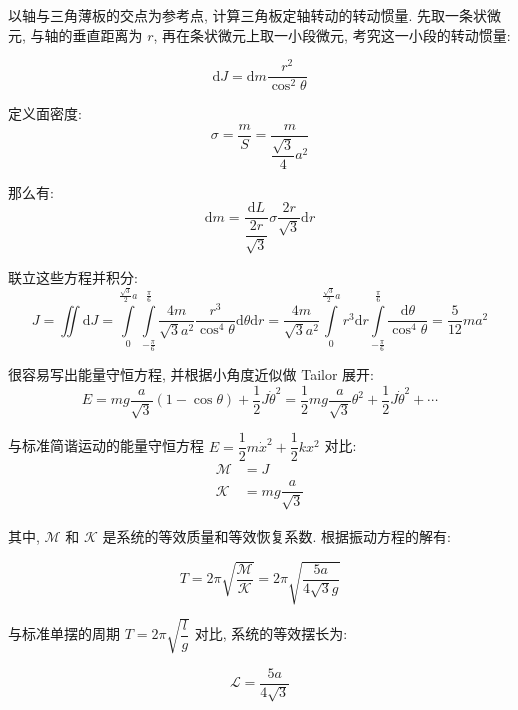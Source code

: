 \documentclass[12pt,a4paper]{article}
\begin{document}
		以轴与三角薄板的交点为参考点, 计算三角板定轴转动的转动惯量. 先取一条状微元, 与轴的垂直距离为 $r$, 再在条状微元上取一小段微元, 考究这一小段的转动惯量:
		
		\begin{equation}
			\mathrm{d}J=\mathrm{d}m\dfrac{r^2}{\cos^2\theta }
		\end{equation}
		
		定义面密度: 
		\begin{equation}
			\sigma=\dfrac{m}{S}=\dfrac{m}{\dfrac{\sqrt{3}}{4}a^2}
		\end{equation}
		
		那么有:
		\begin{equation}
			\mathrm{d}m=\dfrac{\mathrm{d}L}{\dfrac{2r}{\sqrt{3}}}\sigma\dfrac{2r}{\sqrt{3}}\mathrm{d}r
		\end{equation}
		
		联立这些方程并积分:
		\begin{equation}
			J=\iint\mathrm{d} J=\int\limits_{0}^{\frac{\sqrt{3}}{2}a}\int\limits_{-\frac{\pi}{6}}^{\frac{\pi}{6}}\dfrac{4m}{\sqrt{3}a^2}\dfrac{r^3}{\cos^4\theta}\mathrm{d}\theta\mathrm{d}r=\dfrac{4m}{\sqrt{3}a^2}\int\limits_{0}^{\frac{\sqrt{3}}{2}a}r^3\mathrm{d}r\int\limits_{-\frac{\pi}{6}}^{\frac{\pi}{6}}\dfrac{\mathrm{d}\theta}{\cos^4\theta}=\dfrac{5}{12}ma^2
		\end{equation}
		
		很容易写出能量守恒方程, 并根据小角度近似做 Tailor 展开:
		\begin{equation}
			E=mg\dfrac{a}{\sqrt{3}}\left( 1-\cos\theta\right)+\dfrac{1}{2}J\dot{\theta}^2 =\dfrac{1}{2}mg\dfrac{a}{\sqrt{3}}\theta^2+\dfrac{1}{2}J\dot{\theta}^2+\cdots
		\end{equation}
		
		与标准简谐运动的能量守恒方程 $E=\dfrac{1}{2}m\dot{x}^2+\dfrac{1}{2}kx^2$ 对比:
		\begin{align}
			\mathcal{M}&=J
			\\
			\mathcal{K}&=mg\dfrac{a}{\sqrt{3}}
		\end{align}
		
		其中, $\mathcal{M}$ 和 $\mathcal{K}$ 是系统的等效质量和等效恢复系数. 根据振动方程的解有:
		
		$$
		T=2\pi\sqrt{\dfrac{\mathcal{M}}{\mathcal{K}}}=2\pi\sqrt{\dfrac{5a}{4\sqrt{3}g}}
		$$
		
		与标准单摆的周期 $T=2\pi\sqrt{\dfrac{l}{g}}$ 对比, 系统的等效摆长为:
		
		$$
		\mathcal{L}=\dfrac{5a}{4\sqrt{3}}
		$$
		
\end{document}
